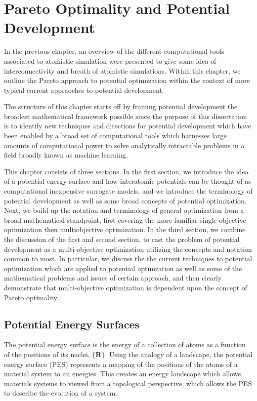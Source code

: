 \chapter{Pareto Optimality and Potential Development}

In the previous chapter, an overview of the different computational tools associated to atomistic simulation were presented to give some idea of interconnectivity and breath of atomistic simulations.  Within this chapter, we outline the Pareto approach to potential optimization within the context of more typical current appraoches to potential development.

The structure of this chapter starts off by framing potential development the broadest mathematical framework possible since the purpose of this dissertation is to identify new techniques and directions for potential development which have been enabled by a broad set of computational tools which harnesses large amounts of computational power to solve analytically intractable problems in a field broadly known as machine learning.

This chapter consists of three sections.  In the first section, we introduce the idea of a potential energy surface and how interatomic potentials can be thought of as computational inexpensive surrogate models, and we introduce the terminology of potential development as well as some broad concepts of potential optimization.
Next, we build up the notation and terminology of general optimization from a broad mathematical standpoint, first covering the more familiar single-objective optimization then multiobjective optimization.
In the third section, we combine the discussion of the first and second section, to cast the problem of potential development as a multi-objective optimization utilizing the concepts and notation common to most.
In particular, we discuss the the current techniques to potential optimization which are applied to potential optimzation as well as some of the mathematical problems and issues of certain approach, and then clearly demonstrate that multi-objective optimization is dependent upon the concept of Pareto optimality.

\section{Potential Energy Surfaces}

The potential energy surface is the energy of a collection of atoms as a function of the positions of its nuclei, $\{\bm{R}\}$.
Using the analogy of a landscape, the potential energy surface (PES) represents a mapping of the positions of the atoms of a material system to an energies.
This creates an energy landscape which allows materials systems to viewed from a topological perspective, which allows the PES to describe the evolution of a system.

